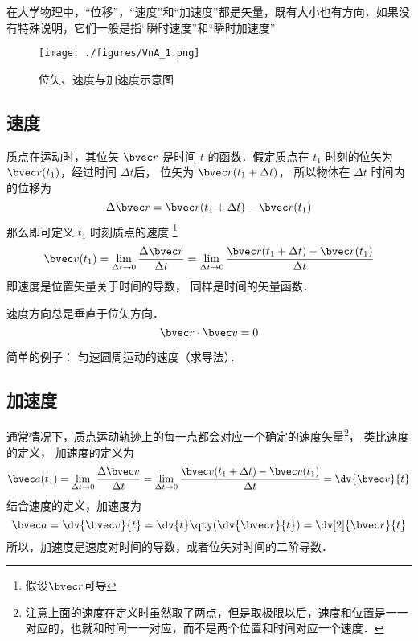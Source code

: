 

在大学物理中，“位移”，“速度”和“加速度”都是矢量，既有大小也有方向．如果没有特殊说明，它们一般是指“瞬时速度”和“瞬时加速度”

\begin{figure}[ht]
\centering
\texttt{[image: ./figures/VnA\_1.png]}
\caption{位矢、速度与加速度示意图} \label{VnA_fig1}
\end{figure}

\subsection{速度}

质点在运动时，其位矢 $\bvec r$ 是时间 $t$ 的函数．假定质点在 $t_1$ 时刻的位矢为 $\bvec r(t_1)$，经过时间 $\Delta t$后， 位矢为 $\bvec r(t_1 + \Delta t)$， 所以物体在 $\Delta t$ 时间内的位移为
\begin{equation}
\Delta \bvec r = \bvec r (t_1 + \Delta t) - \bvec r (t_1)
\end{equation}
那么即可定义 $t_1$ 时刻质点的速度
\footnote{假设$\bvec r$可导}
\begin{equation}
\bvec v(t_1) = \lim_{\Delta t \to 0} \frac{\Delta \bvec r}{\Delta t} = \lim_{\Delta t \to 0} \frac{\bvec r (t_1 + \Delta t) - \bvec r(t_1)}{\Delta t}
\end{equation}
即速度是位置矢量关于时间的导数， 同样是时间的矢量函数．

\begin{theorem}{}
速度方向总是垂直于位矢方向．
\begin{equation}
\bvec r \cdot \bvec v = 0
\end{equation}
\end{theorem}

简单的例子： 匀速圆周运动的速度（求导法）．

\subsection{加速度}

通常情况下，质点运动轨迹上的每一点都会对应一个确定的速度矢量\footnote{注意上面的速度在定义时虽然取了两点，但是取极限以后，速度和位置是一一对应的，也就和时间一一对应，而不是两个位置和时间对应一个速度．}， 类比速度的定义， 加速度的定义为
\begin{equation}\label{VnA_eq4}
\bvec a(t_1) = \lim_{\Delta t \to 0} \frac{\Delta \bvec v}{\Delta t}
= \lim_{\Delta t \to 0} \frac{\bvec v(t_1 + \Delta t) - \bvec v (t_1)}{\Delta t} = \dv{\bvec v}{t}
\end{equation}
结合速度的定义，加速度为
\begin{equation}
\bvec a = \dv{\bvec v}{t} = \dv{t} \qty( \dv{\bvec r}{t} ) = \dv[2]{\bvec r}{t}
\end{equation}
所以，加速度是速度对时间的导数，或者位矢对时间的二阶导数．

